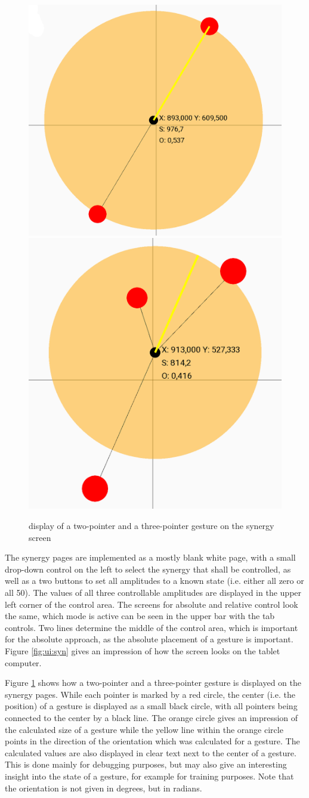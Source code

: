 \begin{figure}
	\caption{display of a two-pointer and a three-pointer gesture on the synergy screen\label{fig:ui:syngest}}
	
	\includegraphics[width=0.5\linewidth]{assets/chpt_impl/syn_2touch}
	\includegraphics[width=0.5\linewidth]{assets/chpt_impl/syn_3touch}
\end{figure}

The synergy pages are implemented as a mostly blank white page, with a small drop-down control on the left to select the synergy that shall be controlled, as well as a two buttons to set all amplitudes to a known state (i.e. either all zero or all 50). The values of all three controllable amplitudes are displayed in the upper left corner of the control area. The screens for absolute and relative control look the same, which mode is active can be seen in the upper bar with the tab controls. Two lines determine the middle of the control area, which is important for the absolute approach, as the absolute placement of a gesture is important. Figure \ref{fig:ui:syn} gives an impression of how the screen looks on the tablet computer.

Figure \ref{fig:ui:syngest} shows how a two-pointer and a three-pointer gesture is displayed on the synergy pages. While each pointer is marked by a red circle, the center (i.e. the position) of a gesture is displayed as a small black circle, with all pointers being connected to the center by a black line. The orange circle gives an impression of the calculated size of a gesture while the yellow line within the orange circle points in the direction of the orientation which was calculated for a gesture. The calculated values are also displayed in clear text next to the center of a gesture. This is done mainly for debugging purposes, but may also give an interesting insight into the state of a gesture, for example for training purposes. Note that the orientation is not given in degrees, but in radians.

